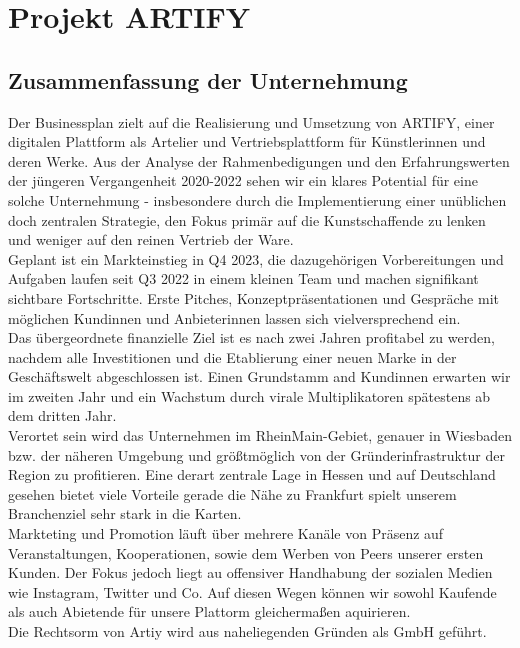 \documentclass[11pt,a4paper]{report}
\begin{document}

\tableofcontents
\chapter{Projekt ARTIFY}
\section{Zusammenfassung der Unternehmung}
Der Businessplan zielt auf die Realisierung und Umsetzung von ARTIFY, einer digitalen Plattform als Artelier und Vertriebsplattform für Künstlerinnen und deren Werke. Aus der Analyse der Rahmenbedigungen und den Erfahrungswerten der jüngeren Vergangenheit 2020-2022 sehen wir ein klares Potential für eine solche Unternehmung - insbesondere durch die Implementierung einer unüblichen doch zentralen Strategie, den Fokus primär auf die Kunstschaffende zu lenken und weniger auf den reinen Vertrieb der Ware.\\ Geplant ist ein Markteinstieg in Q4 2023, die dazugehörigen Vorbereitungen und Aufgaben laufen seit Q3 2022 in einem kleinen Team und machen signifikant sichtbare Fortschritte. Erste Pitches, Konzeptpräsentationen und Gespräche mit möglichen Kundinnen und Anbieterinnen lassen sich vielversprechend ein. \\
Das übergeordnete finanzielle Ziel ist es nach zwei Jahren profitabel zu werden, nachdem alle Investitionen und die Etablierung einer neuen Marke in der Geschäftswelt abgeschlossen ist. Einen Grundstamm and Kundinnen erwarten wir im zweiten Jahr und ein Wachstum durch virale Multiplikatoren spätestens ab dem dritten Jahr.\\
Verortet sein wird das Unternehmen im RheinMain-Gebiet, genauer in Wiesbaden bzw. der näheren Umgebung und größtmöglich von der Gründerinfrastruktur der Region zu profitieren. Eine derart zentrale Lage in Hessen und auf Deutschland gesehen bietet viele Vorteile gerade die Nähe zu Frankfurt spielt unserem Branchenziel sehr stark in die Karten.\\
Markteting und Promotion läuft über mehrere Kanäle von Präsenz auf Veranstaltungen, Kooperationen, sowie dem Werben von Peers unserer ersten Kunden. Der Fokus jedoch liegt au offensiver Handhabung der sozialen Medien wie Instagram, Twitter und Co. Auf diesen Wegen können wir sowohl Kaufende als auch Abietende für unsere Plattorm gleichermaßen aquirieren.\\
Die Rechtsorm von Artiy wird aus naheliegenden Gründen als GmbH geführt.
\end{document}
